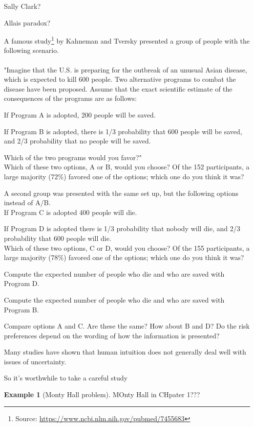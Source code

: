 \documentclass[
]{book}
\theoremstyle{definition}
\theoremstyle{definition}
\newtheorem{example}{Example}[chapter]
\theoremstyle{definition}
\theoremstyle{remark}
\begin{document}
Sally Clark?

Allais paradox?

A famous study\footnote{Source: \url{https://www.ncbi.nlm.nih.gov/pubmed/7455683}} by Kahneman and Tversky presented a group of people
with the following scenario.\\
~\\
"Imagine that the U.S. is preparing for the outbreak of an unusual Asian
disease, which is expected to kill 600 people. Two alternative programs
to combat the disease have been proposed. Assume that the exact
scientific estimate of the consequences of the programs are as follows:

If Program A is adopted, 200 people will be saved.

If Program B is adopted, there is 1/3 probability that 600 people will
be saved, and 2/3 probability that no people will be saved.

Which of the two programs would you favor?"\\

Which of these two options, A or B, would you choose? Of the 152
participants, a large majority (72\%) favored one of the options; which
one do you think it was?

A second group was presented with the same set up, but the following
options instead of A/B.\\

If Program C is adopted 400 people will die.

If Program D is adopted there is 1/3 probability that nobody will die,
and 2/3 probability that 600 people will die.\\

Which of these two options, C or D, would you choose? Of the 155
participants, a large majority (78\%) favored one of the options; which
one do you think it was?

Compute the expected number of people who die and who are saved with
Program D.

Compute the expected number of people who die and who are saved with
Program B.

Compare options A and C. Are these the same? How about B and D? Do the
risk preferences depend on the wording of how the information is
presented?

Many studies have shown that human intuition does not generally deal
well with issues of uncertainty.

So it's worthwhile to take a careful study

\begin{example}[Monty Hall problem]
\protect\hypertarget{exm:monty-hall}{}{\label{exm:monty-hall} {} }MOnty Hall in CHpater 1???
\end{example}
\end{document}
